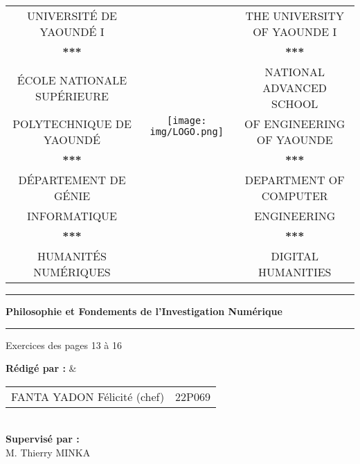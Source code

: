 \documentclass[11pt]{article}
\begin{document}
\begin{center}\hspace*{-0.5cm}
  \begin{tabular}{ccc}
 
    {\large UNIVERSIT\'E DE YAOUND\'E I} & \multirow{8}{*}{\texttt{[image: img/LOGO.png]}} & \large{ THE UNIVERSITY OF YAOUNDE I}\\
    \textbf{***} &    & \textbf{***} \\
    \textcolor{-yellow}{\'ECOLE NATIONALE SUP\'ERIEURE}& & \textcolor{-yellow}{NATIONAL ADVANCED SCHOOL}\\ 
    \textcolor{-yellow}{POLYTECHNIQUE DE YAOUND\'E}   & & \textcolor{-yellow}{OF ENGINEERING OF YAOUNDE} \\
    \textbf{***}    & & \textbf{***} \\
    D\'EPARTEMENT DE G\'ENIE& & DEPARTMENT OF COMPUTER \\ 
    INFORMATIQUE & & ENGINEERING \\
    \textbf{***} &    & \textbf{***} \\
    \textcolor{-yellow}{HUMANITÉS NUMÉRIQUES} & & \textcolor{-yellow}{DIGITAL HUMANITIES}
    \end{tabular}
 
\end{center}
\vspace{2cm}

\pagestyle{fancy}
\begin{center}
\hrule height 2pt
\vspace{0.4cm}
{\LARGE \textbf{Philosophie et Fondements de l’Investigation Numérique}}
\vspace{0.5cm}
\hrule height 2pt
\vspace{0.4cm}
\end{center}
\vspace{0.90cm}
\begin{center}
\large {Exercices des pages 13 à 16}

\vspace{7cm}
\textbf{Rédigé par :} & \\[0.3cm]
\begin{tabular}{l@{\hspace{1cm}}l}
FANTA YADON Félicité (chef) & 22P069 \\[0.3cm]
\end{tabular}\\
\textbf{Supervisé par :}\\[0.3cm]
M. Thierry MINKA\\
\date{}
\end{center}
\newpage
\end{document}
